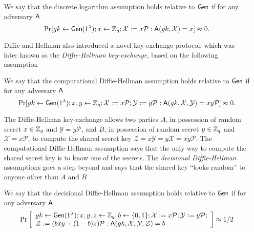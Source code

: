 \begin{definition}
We say that the discrete logarithm assumption holds relative to $\mathsf{Gen}$ if for any adversary $\mathsf{A}$
$$
\Pr[gk\gets\mathsf{Gen}(1^\lambda); x\gets\mathbb{Z}_q; \mathcal{X}:=x\mathcal{P}:\mathsf{A}(gk,\mathcal{X})=x]\approx 0.
$$
\end{definition}
 
Diffie and Hellman also introduced a novel {key-exchange} protocol, which was later known as the \emph{Diffie-Hellman key-exchange}, based on the following assumption

\begin{definition}
We say that the computational Diffie-Hellman assumption holds relative to $\mathsf{Gen}$ if for any adversary $\mathsf{A}$
$$
\Pr[gk\gets\mathsf{Gen}(1^\lambda); x,y\gets\mathbb{Z}_q; \mathcal{X}:=x\mathcal{P};\mathcal{Y}:=y\mathcal{P}:\mathsf{A}(gk,\mathcal{X},\mathcal{Y})=xy\mathcal{P}]\approx 0.
$$
\end{definition}

The Diffie-Hellman key-exchange allows two parties $A$, in possession of random secret $x\in\mathbb{Z}_q$ and $\mathcal{Y}=y\mathcal{P}$, and $B$, in possession of random secret $y\in\mathbb{Z}_q$ and $\mathcal{X}=x\mathcal{P}$, to compute the shared secret key $\mathcal{Z}=x\mathcal{Y}=y\mathcal{X}=xy\mathcal{P}$. The computational Diffie-Hellman assumption says that the only way to compute the shared secret key is to know one of the secrets. The \emph{decisional Diffie-Hellman} assumptions goes a step beyond and says that the shared key ``looks random'' to anyone other than $A$ and $B$

\begin{definition}
We say that the decisional Diffie-Hellman assumption holds relative to $\mathsf{Gen}$ if for any adversary $\mathsf{A}$
$$
\Pr\left[\begin{array}{l}
gk\gets\mathsf{Gen}(1^\lambda); x,y,z\gets\mathbb{Z}_q,b\gets\{0,1\};\mathcal{X}:=x\mathcal{P};\mathcal{Y}:=y\mathcal{P};\\
\mathcal{Z}:=(bxy+(1-b)z)\mathcal{P}:\mathsf{A}(gk,\mathcal{X},\mathcal{Y},\mathcal{Z})=b
\end{array}\right]\approx 1/2
$$
\end{definition}


